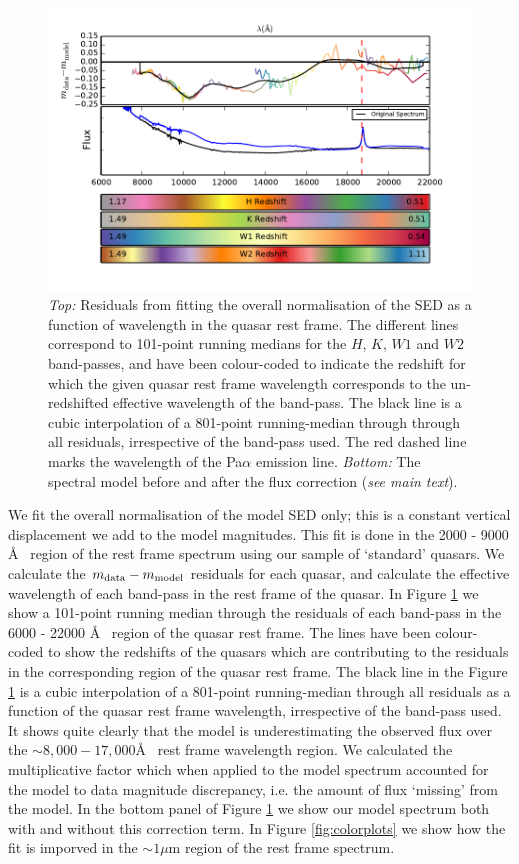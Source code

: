 \begin{figure}
  \centering
  \includegraphics[width=\textwidth]{figures/chapter06/residualscorrection}
  \caption{{\it Top:} Residuals from fitting the overall normalisation of the SED as a function of wavelength in the quasar rest frame. The different lines correspond to 101-point running medians for the $H$, $K$, $W1$ and $W2$ band-passes, and have been colour-coded to indicate the redshift for which the given quasar rest frame wavelength corresponds to the un-redshifted effective wavelength of the band-pass. The black line is a cubic interpolation of a 801-point running-median through through all residuals, irrespective of the band-pass used. The red dashed line marks the wavelength of the Pa$\alpha$ emission line. {\it Bottom:} The spectral model before and after the flux correction ({\it see main text}).}
  \label{fig:modelcorrection}
\end{figure}

We fit the overall normalisation of the model SED only; this is a constant vertical displacement we add to the model magnitudes. This fit is done in the 2000 - 9000 \AA~ region of the rest frame spectrum using our sample of `standard' quasars. We calculate the $m_{\rm data} - m_{\rm model}$ residuals for each quasar, and calculate the effective wavelength of each band-pass in the rest frame of the quasar. In Figure \ref{fig:modelcorrection} we show a 101-point running median through the residuals of each band-pass in the 6000 - 22000 \AA~ region of the quasar rest frame. The lines have been colour-coded to show the redshifts of the quasars which are contributing to the residuals in the corresponding region of the quasar rest frame. The black line in the Figure \ref{fig:modelcorrection} is a cubic interpolation of a 801-point running-median through all residuals as a function of the quasar rest frame wavelength, irrespective of the band-pass used. It shows quite clearly that the model is underestimating the observed flux over the $\sim 8,000 - 17,000$\AA~ rest frame wavelength region. We calculated the multiplicative factor which when applied to the model spectrum accounted for the model to data magnitude discrepancy, i.e. the amount of flux `missing' from the model. In the bottom panel of Figure \ref{fig:modelcorrection} we show our model spectrum both with and without this correction term. In Figure \ref{fig:colorplots} we show how the fit is imporved in the $\sim 1\mu$m region of the rest frame spectrum.  

